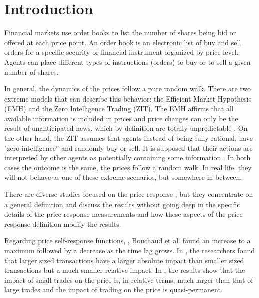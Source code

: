 \section{Introduction}\label{sec:introduction}

Financial markets use order books to list the number of shares being bid or
offered at each price point. An order book is an electronic list of buy and
sell orders for a specific security or financial instrument organized by price
level. Agents can place different types of instructions (orders) to buy or to
sell a given number of shares.

In general, the dynamics of the prices follow a pure random walk. There are two
extreme models that can describe this behavior: the Efficient Market Hypothesis
(EMH) and the Zero Intelligence Trading (ZIT). The EMH affirms that all
available information is included in prices and price changes can only be the
result of unanticipated news, which by definition are totally unpredictable
\cite{EMH_lillo,subtle_nature}. On the other hand, the ZIT assumes that agents
instead of being fully rational, have "zero intelligence” and randomly buy or
sell. It is supposed that their actions are interpreted by other agents as
potentially containing some information \cite{subtle_nature,Wang_2016_cross}.
In both cases the outcome is the same, the prices follow a random walk.
In real life, they will not behave as one of these extreme scenarios, but
somewhere in between.

There are diverse studies focused on the price response
\cite{dissecting_cross,r_walks_liquidity,subtle_nature,Bouchaud_2004,large_prices_changes,pow_law_dist,theory_market_impact,spread_changes_affect,master_curve,EMH_lillo,quant_stock_price_response,ori_pow_law,prop_order_book,Wang_2018_b,Wang_2018_a,Wang_2016_avg,Wang_2016_cross},
but they concentrate on a general definition and discuss the results without
going deep in the specific details of the price response measurements and how
these aspects of the price response definition modify the results.

Regarding price self-response functions,
\cite{r_walks_liquidity,subtle_nature,Bouchaud_2004}, Bouchaud et al. found
an increase to a maximum followed by a decrease as the time lag grows.
In \cite{theory_market_impact}, the researchers found that larger sized
transactions have a larger absolute impact than smaller sized transactions but
a much smaller relative impact. In \cite{prop_order_book}, the results show
that the impact of small trades on the price is, in relative terms, much larger
than that of large trades and the impact of trading on the price is
quasi-permanent.

